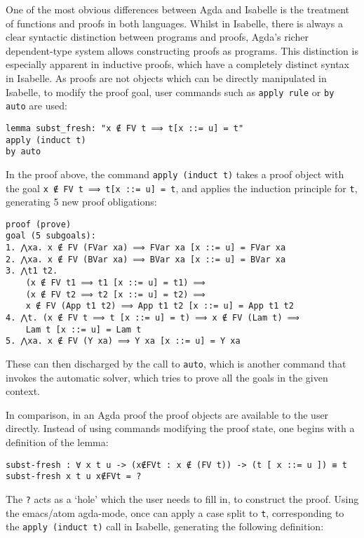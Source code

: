 \documentclass[a4paper, 12pt, twoside]{style/ociamthesis}
\theoremstyle{plain}
\theoremstyle{definition}
\theoremstyle{remark}
\begin{document}
One of the most obvious differences between Agda and Isabelle is the
treatment of functions and proofs in both languages. Whilst in Isabelle,
there is always a clear syntactic distinction between programs and
proofs, Agda's richer dependent-type system allows constructing proofs
as programs. This distinction is especially apparent in inductive
proofs, which have a completely distinct syntax in Isabelle. As proofs
are not objects which can be directly manipulated in Isabelle, to modify
the proof goal, user commands such as \texttt{apply rule} or
\texttt{by auto} are used:

\begin{verbatim}
lemma subst_fresh: "x ∉ FV t ⟹ t[x ::= u] = t"
apply (induct t)
by auto
\end{verbatim}

In the proof above, the command \texttt{apply (induct t)} takes a proof
object with the goal \texttt{x ∉ FV t ⟹ t[x ::= u] = t}, and applies the
induction principle for \texttt{t}, generating 5 new proof obligations:

\begin{verbatim}
proof (prove)
goal (5 subgoals):
1. ⋀xa. x ∉ FV (FVar xa) ⟹ FVar xa [x ::= u] = FVar xa
2. ⋀xa. x ∉ FV (BVar xa) ⟹ BVar xa [x ::= u] = BVar xa
3. ⋀t1 t2.
    (x ∉ FV t1 ⟹ t1 [x ::= u] = t1) ⟹
    (x ∉ FV t2 ⟹ t2 [x ::= u] = t2) ⟹
    x ∉ FV (App t1 t2) ⟹ App t1 t2 [x ::= u] = App t1 t2
4. ⋀t. (x ∉ FV t ⟹ t [x ::= u] = t) ⟹ x ∉ FV (Lam t) ⟹ 
    Lam t [x ::= u] = Lam t
5. ⋀xa. x ∉ FV (Y xa) ⟹ Y xa [x ::= u] = Y xa
\end{verbatim}

These can then discharged by the call to \texttt{auto}, which is another
command that invokes the automatic solver, which tries to prove all the
goals in the given context.

In comparison, in an Agda proof the proof objects are available to the
user directly. Instead of using commands modifying the proof state, one
begins with a definition of the lemma:

\begin{verbatim}
subst-fresh : ∀ x t u -> (x∉FVt : x ∉ (FV t)) -> (t [ x ::= u ]) ≡ t
subst-fresh x t u x∉FVt = ?
\end{verbatim}

The \texttt{?} acts as a `hole' which the user needs to fill in, to
construct the proof. Using the emacs/atom agda-mode, once can apply a
case split to \texttt{t}, corresponding to the \texttt{apply (induct t)}
call in Isabelle, generating the following definition:
\end{document}
